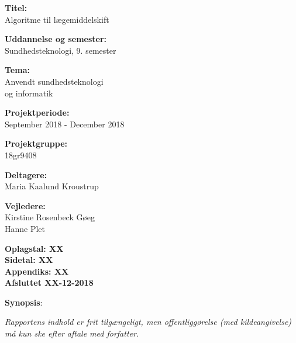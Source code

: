 \begin{minipage}[t]{0.48\textwidth}
\textbf{Titel:} \\[5pt]\bigskip\hspace{2ex}
Algoritme til lægemiddelskift

\textbf{Uddannelse og semester:} \\[5pt]\bigskip\hspace{2ex}
Sundhedsteknologi, 9. semester

\textbf{Tema:} \\[5pt]\bigskip\hspace{2ex}
Anvendt sundhedsteknologi \\ \bigskip\hspace{2ex}
og informatik

\vspace*{2mm}

\textbf{Projektperiode:} \\[5pt]\bigskip\hspace{2ex}
September 2018 - December 2018

\textbf{Projektgruppe:} \\[5pt]\bigskip\hspace{2ex}
18gr9408

\textbf{Deltagere:} \\[5pt]\hspace*{2ex}
Maria Kaalund Kroustrup

\vspace*{5mm}

\textbf{Vejledere:} \\[5pt]\hspace*{2ex}
Kirstine Rosenbeck Gøeg \\\bigskip\hspace{2ex}
Hanne Plet

\vspace*{1cm}

\textbf{Oplagstal: XX} \\
\textbf{Sidetal: XX} \\
\textbf{Appendiks: XX} \\ 
\textbf{Afsluttet XX-12-2018}

\end{minipage}
\hfill
\begin{minipage}[t]{0.483\textwidth}
\textbf{Synopsis}: \\[5pt]
\fbox{\parbox{7cm}{\bigskip\bigskip}}
\end{minipage}

\vfill

{\footnotesize\itshape Rapportens indhold er frit tilgængeligt, men offentliggørelse (med kildeangivelse) må kun ske efter aftale med forfatter.}

